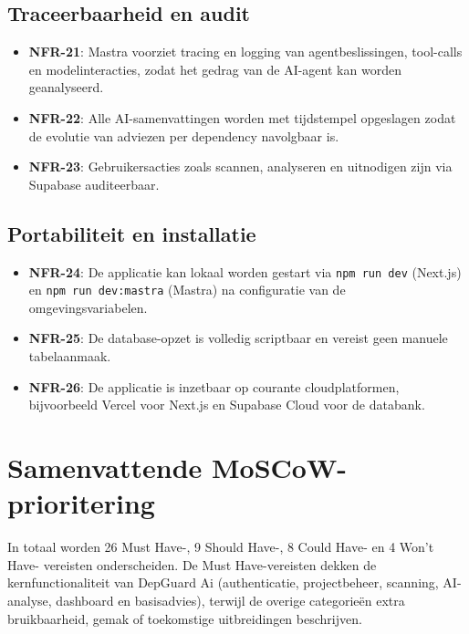 \subsection{Traceerbaarheid en audit}
\label{sec:nfr-traceerbaarheid}

\begin{itemize}
  \item \textbf{NFR-21}: Mastra voorziet tracing en logging van agentbeslissingen, tool-calls en modelinteracties, zodat het gedrag van de AI-agent kan worden geanalyseerd.
  \item \textbf{NFR-22}: Alle AI-samenvattingen worden met tijdstempel opgeslagen zodat de evolutie van adviezen per dependency navolgbaar is.
  \item \textbf{NFR-23}: Gebruikersacties zoals scannen, analyseren en uitnodigen zijn via Supabase auditeerbaar.
\end{itemize}


\subsection{Portabiliteit en installatie}
\label{sec:nfr-portabiliteit}

\begin{itemize}
  \item \textbf{NFR-24}: De applicatie kan lokaal worden gestart via \texttt{npm run dev} (Next.js) en \texttt{npm run dev:mastra} (Mastra) na configuratie van de omgevingsvariabelen.
  \item \textbf{NFR-25}: De database-opzet is volledig scriptbaar en vereist geen manuele tabelaanmaak.
  \item \textbf{NFR-26}: De applicatie is inzetbaar op courante cloudplatformen, bijvoorbeeld Vercel voor Next.js en Supabase Cloud voor de databank.
\end{itemize}


\section{Samenvattende MoSCoW-prioritering}
\label{sec:moscow-overzicht}

In totaal worden 26 Must Have-, 9 Should Have-, 8 Could Have- en 4 Won't Have- vereisten onderscheiden. De Must Have-vereisten dekken de kernfunctionaliteit van DepGuard Ai (authenticatie, projectbeheer, scanning, AI-analyse, dashboard en basisadvies), terwijl de overige categorieën extra bruikbaarheid, gemak of toekomstige uitbreidingen beschrijven.